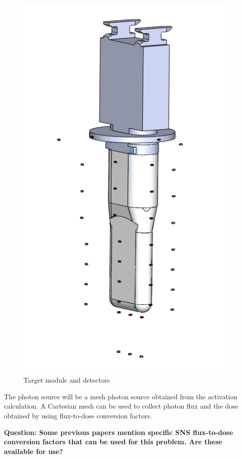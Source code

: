 \begin{figure}[ht!]
	\centering
	\includegraphics[scale=0.3,trim={0.5cm 0.5cm 0.5cm 0.5cm},clip]{figs/target_detectors.png}
	\caption{Target module and detectors}
	\label{fig:target_detectors}
\end{figure}

The photon source will be a mesh photon source obtained from the activation
calculation. A Cartesian mesh can be used to collect photon flux and the dose
obtained by using flux-to-dose conversion factors. 

\textbf{Question: Some previous papers mention specific
SNS flux-to-dose conversion factors that can be used for this problem. Are these
available for use?}

